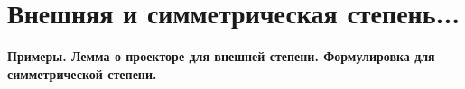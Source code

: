 \section{
 Внешняя и симметрическая степень... %
}

\textbf{Примеры. Лемма о проекторе для внешней степени. Формулировка для симметрической степени.}
